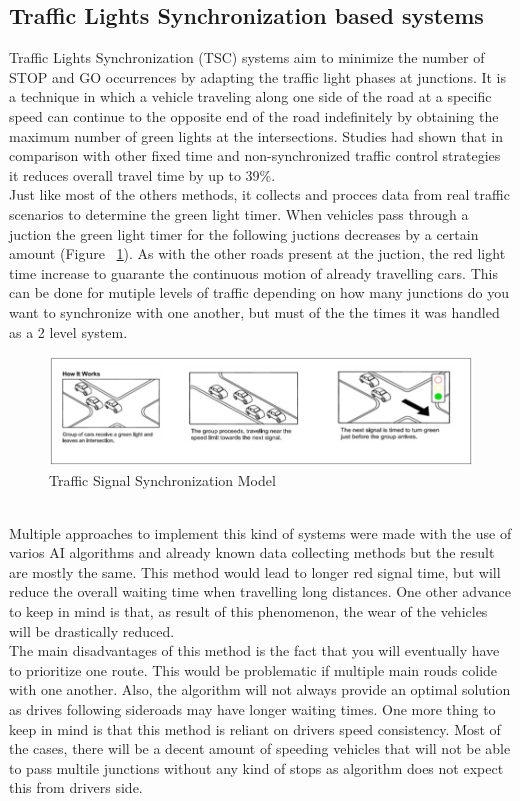 \documentclass[17pt]{article}
\begin{document}
\pagebreak

\subsection{Traffic Lights Synchronization based systems}
\indent \indent
Traffic Lights Synchronization (TSC) \cite{Tomar2022} systems aim  to minimize
the number of STOP and GO occurrences by adapting the traffic light phases at junctions.
It is a technique in which a vehicle traveling along one side of the road at a specific
speed can continue to the opposite end of the road indefinitely by obtaining the maximum
number of green lights at the intersections. Studies had shown that in comparison with
other fixed time and non-synchronized traffic control strategies it reduces overall travel
time by up to 39\%. \cite{ALEKO2019}\\
\indent \indent
Just like most of the others methods, it collects and procces data from real traffic
scenarios to determine the green light timer. When vehicles pass through a juction the
green light timer for the following juctions decreases by a certain amount
(Figure ~\ref{fig:TrafficSignalSynchronization}). As with the other roads present at
the juction, the red light time increase to guarante the continuous motion of already
travelling cars. This can be done for mutiple levels of traffic depending on how many
junctions do you want to synchronize with one another, but must of the the times it
was handled as a 2 level system.
\begin{figure}[h!]
    \includegraphics[width=\textwidth]{TrafficSignalSynchronization.jpg}
    \caption{Traffic Signal Synchronization Model \textcopyright}
    \label{fig:TrafficSignalSynchronization}
\end{figure}\\
\indent \indent
Multiple approaches to implement this kind of systems were made with the use of
varios AI algorithms and already known data collecting methods but the result are
mostly the same. This method would lead to longer red signal time, but will reduce
the overall waiting time when travelling long distances. One other advance to keep in
mind is that, as result of this phenomenon, the wear of the vehicles will be
drastically reduced.\\
\indent \indent
The main disadvantages of this method is the fact that you will eventually have to
prioritize one route. This would be problematic if multiple main rouds colide with
one another. Also, the algorithm will not always provide an optimal solution as
drives following sideroads may have longer waiting times. One more thing to keep in mind
is that this method is reliant on drivers speed consistency. Most of the cases, there 
will be a decent amount of speeding vehicles that will not be able to pass multile
junctions without any kind of stops as algorithm does not expect this from drivers side.
\end{document}
